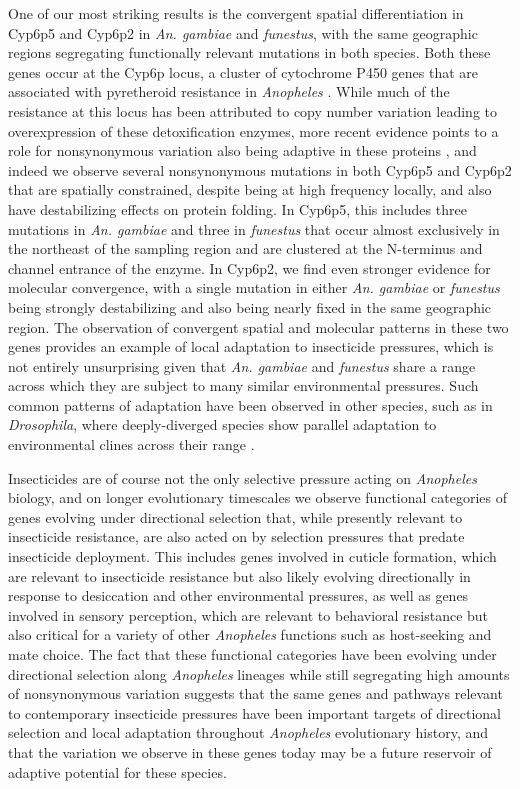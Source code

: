 One of our most striking
results is the convergent spatial differentiation in Cyp6p5 and Cyp6p2 in \textit{An. gambiae} and \textit{funestus},
with the same geographic regions segregating functionally relevant mutations in both species.
Both these genes occur at the Cyp6p locus, a cluster of cytochrome P450 genes that are associated 
with pyretheroid resistance in \textit{Anopheles} \citep{cyp6, p450}.
While much of the resistance at this locus has been attributed to copy number variation leading 
to overexpression of these detoxification enzymes, more recent evidence points to a role for nonsynonymous 
variation also being adaptive in these proteins \citep{Rehmann_Small_Ralph_Kern_2025}, and indeed 
we observe several nonsynonymous mutations in both Cyp6p5 and Cyp6p2 that are spatially constrained,
despite being at high frequency locally, and also have destabilizing effects on protein folding. 
In Cyp6p5, this includes three mutations in \textit{An. gambiae} and three in \textit{funestus} that 
occur almost exclusively in the northeast of the sampling region and are clustered at 
the N-terminus and channel entrance of the enzyme.
In Cyp6p2, we find even stronger evidence for molecular convergence, with a single mutation in either \textit{An. gambiae} 
or \textit{funestus} being strongly destabilizing and also being nearly fixed in the same geographic region.
The observation of convergent spatial and molecular patterns in these two genes provides 
an example of local adaptation to insecticide pressures, which is not entirely unsurprising given that
\textit{An. gambiae} and \textit{funestus} share a range across which they are subject to many similar environmental pressures.
Such common patterns of adaptation have been observed in other species, such as in \textit{Drosophila}, where
deeply-diverged species show parallel adaptation to environmental clines across their range \citep{Zhao_Begun_2017}.


Insecticides are of course not the only selective pressure 
acting on \textit{Anopheles} biology, and on longer evolutionary timescales we observe functional 
categories of genes evolving under directional selection that,
while presently relevant to insecticide resistance, are also 
acted on by selection pressures that predate insecticide deployment.
This includes genes involved in cuticle formation, which are 
relevant to insecticide resistance but also likely
evolving directionally in response to desiccation and other environmental 
pressures, as well as genes involved in sensory perception,
which are relevant to behavioral resistance but also critical 
for a variety of other \textit{Anopheles} 
functions such as host-seeking and mate choice.
The fact that these functional categories have been evolving under 
directional selection along \textit{Anopheles} lineages while
still segregating high amounts of nonsynonymous variation suggests that the same genes 
and pathways relevant to contemporary insecticide pressures
have been important targets of directional selection and 
local adaptation throughout \textit{Anopheles} evolutionary history,
and that the variation we observe in these genes today may 
be a future reservoir of adaptive potential for these species.

